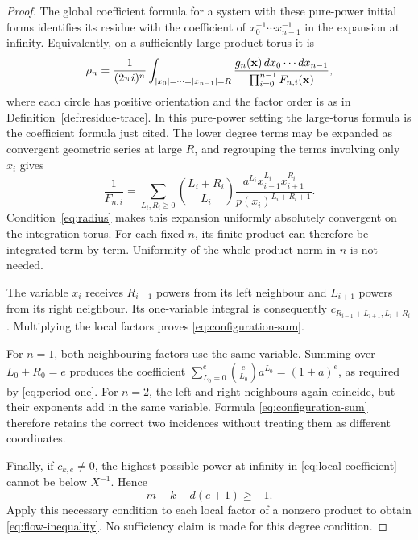 \begin{proof}
The global coefficient formula for a system with these pure-power
initial forms \citep[Theorem~2.3 of the author preprint]{cattani1996residues}
identifies its residue with the coefficient of
$x_0^{-1}\cdots x_{n-1}^{-1}$ in the expansion at infinity. Equivalently,
on a sufficiently large product torus it is
\begin{equation}\label{eq:torus-residue}
 \rho_n=\frac{1}{(2\pi i)^n}
 \int_{|x_0|=\cdots=|x_{n-1}|=R}
 \frac{g_n(\mathbf x)\,dx_0\cdots dx_{n-1}}
      {\prod_{i=0}^{n-1}F_{n,i}(\mathbf x)},
\end{equation}
where each circle has positive orientation and the factor order is as
in Definition~\ref{def:residue-trace}. In this pure-power setting the
large-torus formula is the coefficient formula just cited. The lower
degree terms may be expanded as convergent geometric series at large
$R$, and regrouping the terms involving only $x_i$ gives
\begin{equation}\label{eq:geometric-expansion}
 \frac{1}{F_{n,i}}=
 \sum_{L_i,R_i\ge0}\binom{L_i+R_i}{L_i}
 \frac{a^{L_i}x_{i-1}^{L_i}x_{i+1}^{R_i}}
      {p(x_i)^{L_i+R_i+1}}.
\end{equation}
Condition~\eqref{eq:radius} makes this expansion uniformly absolutely
convergent on the integration torus. For each fixed $n$, its finite
product can therefore be integrated term by term. Uniformity of the
whole product norm in $n$ is not needed.

The variable $x_i$ receives $R_{i-1}$ powers from its left neighbour
and $L_{i+1}$ powers from its right neighbour. Its one-variable integral
is consequently $c_{R_{i-1}+L_{i+1},L_i+R_i}$. Multiplying the local
factors proves \eqref{eq:configuration-sum}.

For $n=1$, both neighbouring factors use the same variable. Summing
over $L_0+R_0=e$ produces the coefficient
$\sum_{L_0=0}^e\binom e{L_0}a^{L_0}=(1+a)^e$, as required by
\eqref{eq:period-one}. For $n=2$, the left and right neighbours again
coincide, but their exponents add in the same variable. Formula
\eqref{eq:configuration-sum} therefore retains the correct two
incidences without treating them as different coordinates.

Finally, if $c_{k,e}\ne0$, the highest possible power at infinity in
\eqref{eq:local-coefficient} cannot be below $X^{-1}$. Hence
\begin{equation}\label{eq:local-degree-condition}
 m+k-d(e+1)\ge-1.
\end{equation}
Apply this necessary condition to each local factor of a nonzero
product to obtain \eqref{eq:flow-inequality}. No sufficiency claim is
made for this degree condition.
\end{proof}
